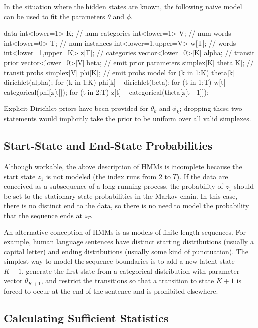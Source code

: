 In the situation where the hidden states are known, the following
naive model can be used to fit the parameters $\theta$ and $\phi$.
%
\begin{stancode}
data {
  int<lower=1> K;  // num categories
  int<lower=1> V;  // num words
  int<lower=0> T;  // num instances
  int<lower=1,upper=V> w[T]; // words
  int<lower=1,upper=K> z[T]; // categories
  vector<lower=0>[K] alpha;  // transit prior
  vector<lower=0>[V] beta;   // emit prior
}
parameters {
  simplex[K] theta[K];  // transit probs
  simplex[V] phi[K];    // emit probs
}
model {
  for (k in 1:K)
    theta[k] ~ dirichlet(alpha);
  for (k in 1:K)
    phi[k] ~ dirichlet(beta);
  for (t in 1:T)
    w[t] ~ categorical(phi[z[t]]);
  for (t in 2:T)
    z[t] ~ categorical(theta[z[t - 1]]);
}
\end{stancode}
%
Explicit Dirichlet priors have been provided for $\theta_k$ and
$\phi_k$; dropping these two statements would implicitly take the
prior to be uniform over all valid simplexes.

\subsection{Start-State and End-State Probabilities}

Although workable, the above description of HMMs is incomplete because
the start state $z_1$ is not modeled (the index runs from 2 to $T$).
If the data are conceived as a subsequence of a long-running process,
the probability of $z_1$ should be set to the stationary state
probabilities in the Markov chain.  In this case, there is no distinct
end to the data, so there is no need to model the probability that the
sequence ends at $z_T$.

An alternative conception of HMMs is as models of finite-length
sequences.  For example, human language sentences have distinct
starting distributions (usually a capital letter) and ending
distributions (usually some kind of punctuation).  The simplest way to
model the sequence boundaries is to add a new latent state $K+1$,
generate the first state from a categorical distribution with
parameter vector $\theta_{K+1}$, and restrict the transitions so that
a transition to state $K+1$ is forced to occur at the end of the
sentence and is prohibited elsewhere.

\subsection{Calculating Sufficient Statistics}

